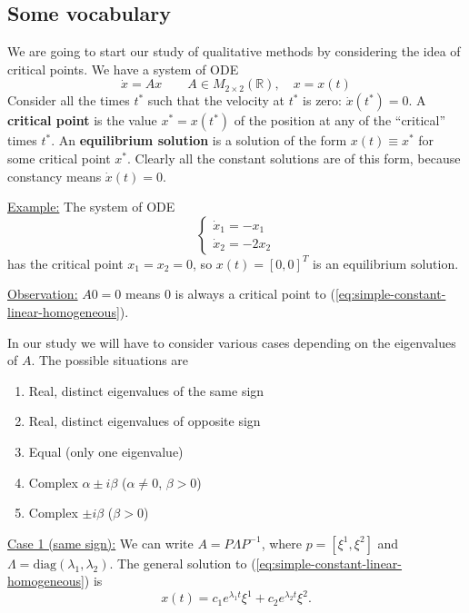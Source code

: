 \documentclass[11pt, letterpaper, oneside]{article}     %
\numberwithin{equation}{subsection}
\theoremstyle{definition}
\numberwithin{theorem}{section}
\theoremstyle{remark}
\newcommand{\RR}{\mathbb{R}}
\begin{document}
\subsection{Some vocabulary}

We are going to start our study of qualitative methods by considering the idea of critical points. We have a system of ODE
\begin{equation}\label{eq:simple-constant-linear-homogeneous}
  \dot x = Ax\quad\quad
  A \in M_{2\times2}(\RR),\quad
  x = x(t)
\end{equation}
Consider all the times $t^*$ such that the velocity at $t^*$ is zero: $\dot x(t^*) = 0$. A \textbf{critical point} is the value $x^* = x(t^*)$ of the position at any of the ``critical'' times $t^*$. An \textbf{equilibrium solution} is a solution of the form $x(t) \equiv x^*$ for some critical point $x^*$. Clearly all the constant solutions are of this form, because constancy means $\dot x(t) = 0$.

\underline{Example:} The system of ODE
\begin{equation}
  \begin{cases}
    \dot x_1 = -x_1\\
    \dot x_2 = -2x_2
  \end{cases}
\end{equation}
has the critical point $x_1 = x_2 = 0$, so $x(t) = [0, 0]^T$ is an equilibrium solution.

\underline{Observation:} $A 0 = 0$ means $0$ is always a critical point to (\ref{eq:simple-constant-linear-homogeneous}).

In our study we will have to consider various cases depending on the eigenvalues of $A$. The possible situations are
\begin{enumerate}
\item Real, distinct eigenvalues of the same sign
\item Real, distinct eigenvalues of opposite sign
\item Equal (only one eigenvalue)
\item Complex $\alpha \pm i\beta$ ($\alpha \neq 0$, $\beta > 0$)
\item Complex $\pm i\beta$ ($\beta > 0$)
\end{enumerate}

\noindent
\underline{Case 1 (same sign):} We can write $A = P\Lambda P^{-1}$, where $p = [\xi^1, \xi^2]$ and $\Lambda = \text{diag}(\lambda_1, \lambda_2)$. The general solution to (\ref{eq:simple-constant-linear-homogeneous}) is
\begin{equation}\label{eq:general-solution-nodal-source}
  x(t) = c_1e^{\lambda_1t}\xi^1 + c_2e^{\lambda_2t}\xi^2.
\end{equation}
\end{document}

